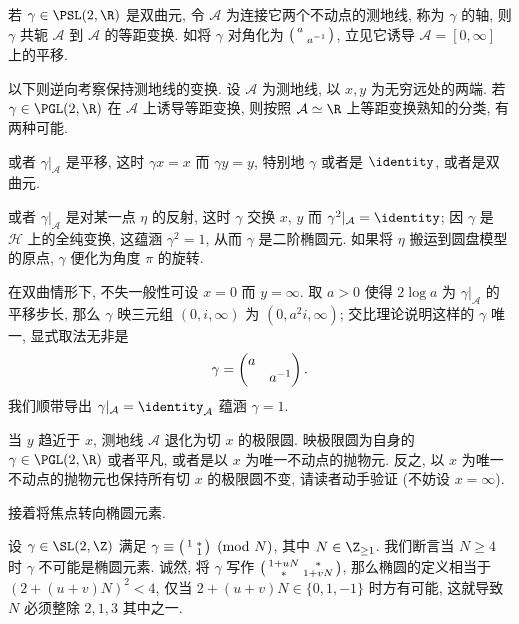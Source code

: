 \begin{example}\label{eg:sliding}
	若 $\gamma \in \PSL(2,\R)$ 是双曲元, 令 $\mathcal{A}$ 为连接它两个不动点的测地线, 称为 $\gamma$ 的轴, 则 $\gamma$ 共轭 $\mathcal{A}$ 到 $\mathcal{A}$ 的等距变换. 如将 $\gamma$ 对角化为 $\bigl(\begin{smallmatrix} a &  \\  & a^{-1} \end{smallmatrix}\bigr)$, 立见它诱导 $\mathcal{A} = [0, \infty]$ 上的平移.
	
	以下则逆向考察保持测地线的变换. 设 $\mathcal{A}$ 为测地线, 以 $x,y$ 为无穷远处的两端. 若 $\gamma \in \PGL(2,\R)$ 在 $\mathcal{A}$ 上诱导等距变换, 则按照 $\mathcal{A} \simeq \R$ 上等距变换熟知的分类, 有两种可能.
	\begin{compactitem}
		\item 或者 $\gamma|_{\mathcal{A}}$ 是平移, 这时 $\gamma x = x$ 而 $\gamma y = y$, 特别地 $\gamma$ 或者是 $\identity$, 或者是双曲元.
		\item 或者 $\gamma|_{\mathcal{A}}$ 是对某一点 $\eta$ 的反射, 这时 $\gamma$ 交换 $x$, $y$ 而 $\gamma^2|_{\mathcal{A}} = \identity$; 因 $\gamma$ 是 $\mathcal{H}$ 上的全纯变换, 这蕴涵 $\gamma^2 = 1$, 从而 $\gamma$ 是二阶椭圆元. 如果将 $\eta$ 搬运到圆盘模型的原点, $\gamma$ 便化为角度 $\pi$ 的旋转.
	\end{compactitem}
	在双曲情形下, 不失一般性可设 $x=0$ 而 $y = \infty$. 取 $a > 0$ 使得 $2\log a$ 为 $\gamma|_{\mathcal{A}}$ 的平移步长, 那么 $\gamma$ 映三元组 $(0, i, \infty)$ 为 $(0, a^2 i, \infty)$; 交比理论说明这样的 $\gamma$ 唯一, 显式取法无非是
	\[ \gamma = \begin{pmatrix} a &  \\  & a^{-1} \end{pmatrix}. \]
	我们顺带导出 $\gamma|_{\mathcal{A}} = \identity_{\mathcal{A}}$ 蕴涵 $\gamma = 1$.
	\begin{center}\end{center}
	当 $y$ 趋近于 $x$, 测地线 $\mathcal{A}$ 退化为切 $x$ 的极限圆. 映极限圆为自身的 $\gamma \in \PGL(2,\R)$ 或者平凡, 或者是以 $x$ 为唯一不动点的抛物元. 反之, 以 $x$ 为唯一不动点的抛物元也保持所有切 $x$ 的极限圆不变, 请读者动手验证 (不妨设 $x = \infty$).
\end{example}

接着将焦点转向椭圆元素.
\begin{example}\label{eg:Gamma1-neat}
	设 $\gamma \in \SL(2,\Z)$ 满足 $\gamma \equiv \bigl(\begin{smallmatrix} 1 & * \\  & 1 \end{smallmatrix}\bigr) \pmod{N}$, 其中 $N \in \Z_{\geq 1}$. 我们断言当 $N \geq 4$ 时 $\gamma$ 不可能是椭圆元素. 诚然, 将 $\gamma$ 写作 $\bigl(\begin{smallmatrix} 1 + uN & * \\ * & 1 + vN \end{smallmatrix}\bigr)$, 那么椭圆的定义相当于 $(2 + (u+v)N)^2 < 4$, 仅当 $2 + (u+v)N \in \{0, 1, -1\}$ 时方有可能, 这就导致 $N$ 必须整除 $2,1,3$ 其中之一.
\end{example}

